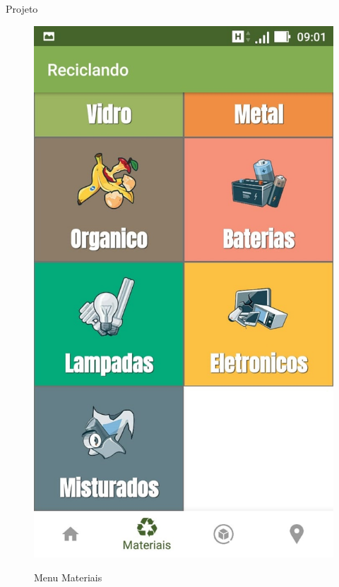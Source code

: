 \documentclass[
	12pt,				%
	openright,			%
	twoside,			%
	a4paper,			%
	english,			%
	french,				%
	spanish,			%
	brazil				%
	]{abntex2}
\begin{document}
\begin{chapter}{Projeto}
\begin{figure}[htb]
\begin{minipage}{0.45\textwidth}
     \label{fig:tela_menu_material_1}
  \end{minipage}
  \hfill
  \begin{minipage}{0.45\textwidth}
    \centering
    \caption{Menu Materiais}
    \includegraphics[scale=0.35]{media/tela_menu_material_2.jpg}
     \label{fig:tela_menu_material_2}
  \end{minipage}
\end{figure}


\end{chapter}
\end{document}

